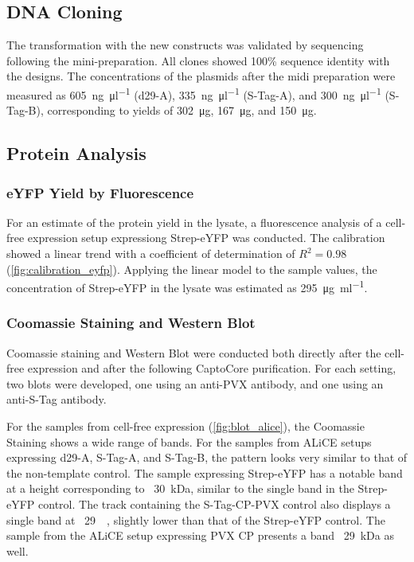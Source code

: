 \subsection{DNA Cloning}
The transformation with the new constructs was validated by sequencing following the mini-preparation. All clones showed 100\% sequence identity with the designs. The concentrations of the plasmids after the midi preparation were measured as \SI{605}{\nano\gram\per\micro\litre} (d29-A), \SI{335}{\nano\gram\per\micro\litre} (S-Tag-A), and \SI{300}{\nano\gram\per\micro\litre} (S-Tag-B), corresponding to yields of \SI{302}{\micro\gram}, \SI{167}{\micro\gram}, and \SI{150}{\micro\gram}.

\subsection{Protein Analysis}
\subsubsection{eYFP Yield by Fluorescence}
For an estimate of the protein yield in the lysate, a fluorescence analysis of a cell-free expression setup expressiong Strep-eYFP was conducted. The calibration showed a linear trend with a coefficient of determination of $R^2 = 0.98$ (\autoref{fig:calibration_eyfp}). Applying the linear model to the sample values, the concentration of Strep-eYFP in the lysate was estimated as \SI{295}{\micro\gram\per\milli\litre}.

\subsubsection{Coomassie Staining and Western Blot} 
Coomassie staining and Western Blot were conducted both directly after the cell-free expression and after the following CaptoCore purification. For each setting, two blots were developed, one using an anti-PVX antibody, and one using an anti-S-Tag antibody. 

For the samples from cell-free expression (\autoref{fig:blot_alice}), the Coomassie Staining shows a wide range of bands. For the samples from ALiCE setups expressing d29-A, S-Tag-A, and S-Tag-B, the pattern looks very similar to that of the non-template control. The sample expressing Strep-eYFP has a notable band at a height corresponding to ~\SI{30}{\kilo\dalton}, similar to the single band in the Strep-eYFP control. The track containing the S-Tag-CP-PVX control also displays a single band at ~\SI{29}{\kilo\Dalton}, slightly lower than that of the Strep-eYFP control. The sample from the ALiCE setup expressing PVX CP presents a band ~\SI{29}{\kilo\dalton} as well. 

